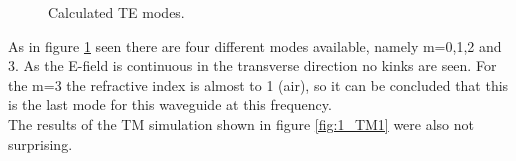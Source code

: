 \begin{figure}[h]
\caption{Calculated TE modes.}%
\label{fig:1_TE}%
\end{figure}

\newpage

As in figure \ref{fig:1_TE} seen there are four different modes available, namely m=0,1,2 and 3. As the E-field is continuous in the transverse direction no kinks are seen.  For the m=3 the refractive index is almost to 1 (air), so it can be concluded that this is the last mode for this waveguide at this frequency.\\
The results of the TM simulation shown in figure \ref{fig:1_TM1} were also not surprising.

